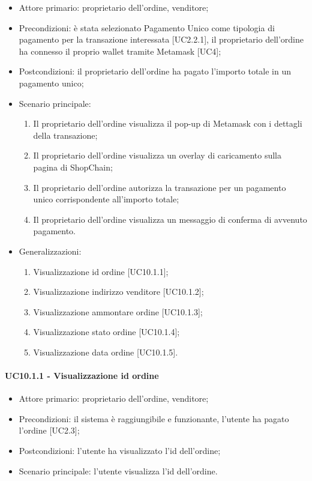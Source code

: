 \begin{itemize}
    \item Attore primario: proprietario dell'ordine, venditore;
    \item Precondizioni: è stata selezionato Pagamento Unico come tipologia di pagamento per la transazione interessata [UC2.2.1], 
            il proprietario dell'ordine ha connesso il proprio wallet\glo{} tramite Metamask\glo{} [UC4];
    \item Postcondizioni: il proprietario dell'ordine ha pagato l'importo totale in un pagamento unico;
    \item Scenario principale:
    \begin{enumerate}
        \item Il proprietario dell'ordine visualizza il pop-up di Metamask\glo{} con i dettagli della transazione;
        \item Il proprietario dell'ordine visualizza un overlay di caricamento sulla pagina di ShopChain;
        \item Il proprietario dell'ordine autorizza la transazione per un pagamento unico corrispondente all'importo totale;
        \item Il proprietario dell'ordine visualizza un messaggio di conferma di avvenuto pagamento.
    \end{enumerate}
    \item Generalizzazioni:
        \begin{enumerate}
            \item Visualizzazione id ordine [UC10.1.1];
            \item Visualizzazione indirizzo venditore [UC10.1.2];
            \item Visualizzazione ammontare ordine [UC10.1.3];
            \item Visualizzazione stato ordine [UC10.1.4];
            \item Visualizzazione data ordine [UC10.1.5].
        \end{enumerate}
\end{itemize}

\paragraph{UC10.1.1 - Visualizzazione id ordine}

\begin{itemize}
    \item Attore primario: proprietario dell'ordine, venditore;
    \item Precondizioni: il sistema è raggiungibile e funzionante, l'utente ha pagato l'ordine [UC2.3];
    \item Postcondizioni: l'utente ha visualizzato l'id dell'ordine;
    \item Scenario principale: l'utente visualizza l'id dell'ordine.
\end{itemize}

